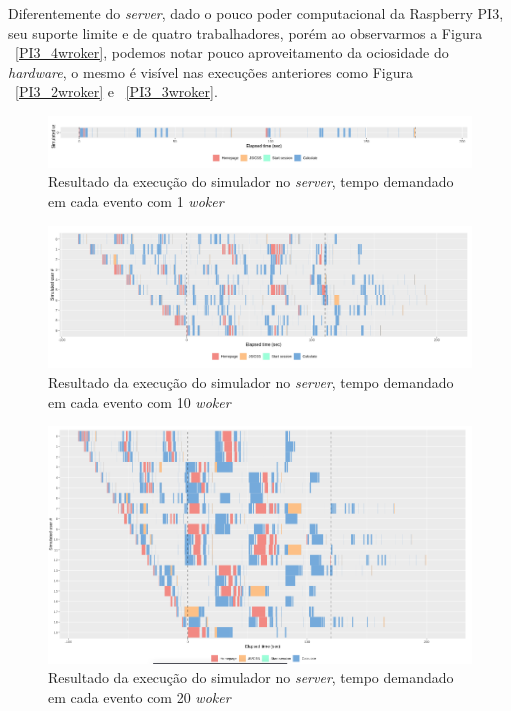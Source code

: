 \documentclass[12pt,english,brazil]{article}
\begin{document}
Diferentemente do \emph{server}, dado o pouco poder computacional da Raspberry PI3, seu suporte limite e de quatro trabalhadores, porém ao observarmos a Figura ~\ref{PI3_4wroker}, podemos notar pouco aproveitamento da ociosidade do \emph{hardware}, o mesmo é visível nas execuções anteriores como Figura ~\ref{PI3_2wroker} e ~\ref{PI3_3wroker}.



\begin{figure}[htbp]
  \centering 
  \includegraphics[scale=.4]{paperWSCAD2021/figures/user_x64_1_worker.png}
  \caption{Resultado da execução do simulador no \emph{server}, tempo demandado em cada evento com 1 \emph{woker}}
  \label{x64_1wroker}
\end{figure}

\begin{figure}[htbp]
  \centering 
  \includegraphics[scale=.4]{paperWSCAD2021/figures/user_x64_10_worker.png}
  \caption{Resultado da execução do simulador no \emph{server}, tempo demandado em cada evento com 10 \emph{woker}}
  \label{x64_10wroker}
\end{figure}

\begin{figure}[htbp]
  \centering 
  \includegraphics[scale=.4]{paperWSCAD2021/figures/user_x64_20_worker.png}
  \caption{Resultado da execução do simulador no \emph{server}, tempo demandado em cada evento com 20 \emph{woker}}
  \label{x64_20wroker}
\end{figure}
\end{document}
